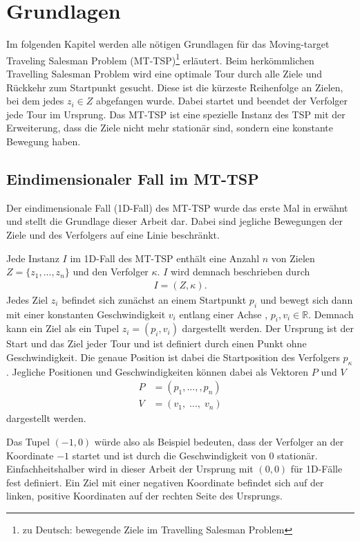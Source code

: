 \documentclass[german,version-2019-11]{uzl-thesis}
\begin{document}
\chapter{Grundlagen}
\label{chapter-use}
Im folgenden Kapitel werden alle nötigen Grundlagen für das Moving-target Traveling Salesman Problem (MT-TSP)\footnote{zu Deutsch: bewegende Ziele im Travelling Salesman Problem} erläutert. Beim herkömmlichen Travelling Salesman Problem wird eine optimale Tour durch alle Ziele und Rückkehr zum Startpunkt gesucht. Diese ist die kürzeste Reihenfolge an Zielen, bei dem jedes $z_i\in Z$ abgefangen wurde. Dabei startet und beendet der Verfolger jede Tour im Ursprung. Das MT-TSP ist eine spezielle Instanz des TSP mit der Erweiterung, dass die Ziele nicht mehr stationär sind, sondern eine konstante Bewegung haben.


\section{Eindimensionaler Fall im MT-TSP}
Der eindimensionale Fall (1D-Fall) des MT-TSP wurde das erste Mal in \cite{helvig} erwähnt und stellt die Grundlage dieser Arbeit dar. Dabei sind jegliche Bewegungen der Ziele und des Verfolgers auf eine Linie beschränkt. 
\begin{definition} 
\label{def:Instanz}
Jede Instanz $I$ im 1D-Fall des MT-TSP enthält eine Anzahl $n$ von Zielen $Z = \{z_1,...,z_n\}$ und den Verfolger $\kappa$. $I$ wird demnach beschrieben durch
\begin{align*}
I = (Z, \kappa).
\end{align*}
Jedes Ziel $z_i$ befindet sich zunächst an einem Startpunkt $p_i$ und bewegt sich dann mit einer konstanten Geschwindigkeit $v_i$ entlang einer Achse , $p_i, v_i \in\mathbb{R}$. Demnach kann ein Ziel als ein Tupel $z_i = (p_i, v_i)$ dargestellt werden. Der Ursprung ist der Start und das Ziel jeder Tour und ist definiert durch einen Punkt ohne Geschwindigkeit. Die genaue Position ist dabei die Startposition des Verfolgers $p_{\kappa}$. Jegliche Positionen und Geschwindigkeiten können dabei als Vektoren $P$ und $V$ 
\begin{align*}
P &= (p_1, ..., ,p_n)\\
V &= (v_1,\; ...,\; v_n)
\end{align*}\newpage\noindent
dargestellt werden.
\end{definition}\noindent
Das Tupel $(-1,0)$ würde also als Beispiel bedeuten, dass der Verfolger an der Koordinate $-1$ startet und ist durch die Geschwindigkeit von $0$ stationär. Einfachheitshalber wird in dieser Arbeit der Ursprung mit $(0,0)$ für 1D-Fälle fest definiert. Ein Ziel mit einer negativen Koordinate befindet sich auf der linken, positive Koordinaten auf der rechten Seite des Ursprungs. 
\end{document}
